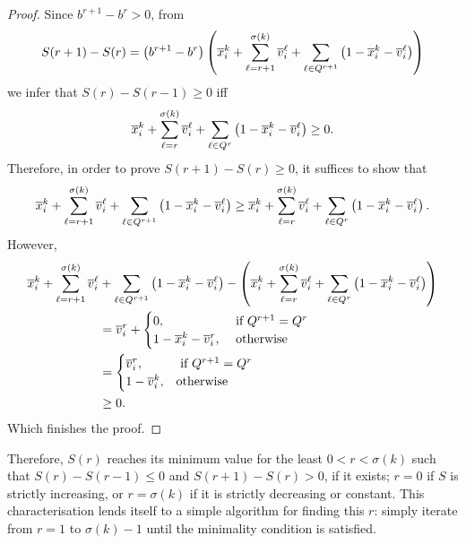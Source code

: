 \begin{proof}
    Since $b^{r + 1} - b^r > 0$, from
    \[
        S(r + 1) - S(r) =
            \left(b^{r + 1} - b^r\right)
            \left(
                \overline{x}_i^k
                + \sum_{\ell = r + 1}^{\sigma(k)} \overline{v}_i^\ell
                + \sum_{\ell \in Q^{r + 1}} \left(1 - \overline{x}_i^k - \overline{v}_i^\ell\right)
            \right)
    \]
    we infer that $S(r) - S(r - 1) \geq 0$ iff
    \[
        \overline{x}_i^k
        + \sum_{\ell = r}^{\sigma(k)} \overline{v}_i^\ell
        + \sum_{\ell \in Q^r} \left(1 - \overline{x}_i^k - \overline{v}_i^\ell\right)
        \geq 0.
    \]
    Therefore, in order to prove $S(r + 1) - S(r) \geq 0$, it suffices to show
    that
    \[
            \overline{x}_i^k
            + \sum_{\ell = r + 1}^{\sigma(k)} \overline{v}_i^\ell
            + \sum_{\ell \in Q^{r + 1}} \left(1 - \overline{x}_i^k - \overline{v}_i^\ell\right)
        \geq
            \overline{x}_i^k
            + \sum_{\ell = r}^{\sigma(k)} \overline{v}_i^\ell
            + \sum_{\ell \in Q^r} \left(1 - \overline{x}_i^k - \overline{v}_i^\ell\right).
    \]
    However,
    \begin{align*}
        \overline{x}_i^k
        + \sum_{\ell = r + 1}^{\sigma(k)} \overline{v}_i^\ell
            &+ \sum_{\ell \in Q^{r + 1}} \left(1 - \overline{x}_i^k - \overline{v}_i^\ell\right)
             - \left(
                   \overline{x}_i^k
                   + \sum_{\ell = r}^{\sigma(k)} \overline{v}_i^\ell
                   + \sum_{\ell \in Q^r} \left(1 - \overline{x}_i^k - \overline{v}_i^\ell\right)
               \right)\\
            &= \overline{v}_i^r +
                \begin{cases}
                    0,                     &\text{ if } Q^{r + 1} = Q^r\\
                    1 - \overline{x}_i^k - \overline{v}_i^r, &\text{ otherwise}
                \end{cases}\\
            &=  \begin{cases}
                    \overline{v}_i^r,     &\text{ if } Q^{r + 1} = Q^r\\
                    1 - \overline{v}_i^k, &\text{otherwise}
                \end{cases}\\
            &\geq 0.
    \end{align*}
    Which finishes the proof.
\end{proof}

Therefore, $S(r)$ reaches its minimum value for the least $0 < r < \sigma(k)$
such that $S(r) - S(r - 1) \leq 0$ and $S(r + 1) - S(r) > 0$, if it exists; $r =
0$ if $S$ is strictly increasing, or $r = \sigma(k)$ if it is strictly
decreasing or constant. This characterisation lends itself to a simple algorithm
for finding this $r$: simply iterate from $r = 1$ to $\sigma(k) - 1$ until the
minimality condition is satisfied.

